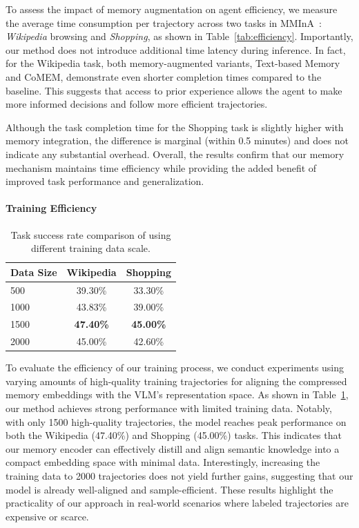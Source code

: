 \documentclass{article} %
\begin{document}
To assess the impact of memory augmentation on agent efficiency, we measure the average time consumption per trajectory across two tasks in MMInA~\citep{zhang2024mmina}: \textit{Wikipedia} browsing and \textit{Shopping}, as shown in Table~\ref{tab:efficiency}. Importantly, our method does not introduce additional time latency during inference. In fact, for the Wikipedia task, both memory-augmented variants, Text-based Memory and CoMEM, demonstrate even shorter completion times compared to the baseline. This suggests that access to prior experience allows the agent to make more informed decisions and follow more efficient trajectories. 

Although the task completion time for the Shopping task is slightly higher with memory integration, the difference is marginal (within 0.5 minutes) and does not indicate any substantial overhead. Overall, the results confirm that our memory mechanism maintains time efficiency while providing the added benefit of improved task performance and generalization.

\paragraph{Training Efficiency}

\begin{table}
\vspace{-1.2em}
\centering
\caption{Task success rate comparison of using different training data scale.}
\vspace{-0.3em}
\small
\begin{tabular}{lcc}
\toprule
\textbf{Data Size} & \textbf{Wikipedia} & \textbf{Shopping} \\
\midrule
500  & 39.30\% & 33.30\% \\
1000 & 43.83\% & 39.00\% \\
1500& \textbf{47.40\%} & \textbf{45.00\%} \\
2000 & 45.00\% & 42.60\% \\
\bottomrule
\end{tabular}
\label{tab:training-efficiency}
\vspace{-1em}
\end{table}

To evaluate the efficiency of our training process, we conduct experiments using varying amounts of high-quality training trajectories for aligning the compressed memory embeddings with the VLM's representation space. As shown in Table~\ref{tab:training-efficiency}, our method achieves strong performance with limited training data. Notably, with only 1500 high-quality trajectories, the model reaches peak performance on both the Wikipedia (47.40\%) and Shopping (45.00\%) tasks. This indicates that our memory encoder can effectively distill and align semantic knowledge into a compact embedding space with minimal data. Interestingly, increasing the training data to 2000 trajectories does not yield further gains, suggesting that our model is already well-aligned and sample-efficient. These results highlight the practicality of our approach in real-world scenarios where labeled trajectories are expensive or scarce.
\end{document}
